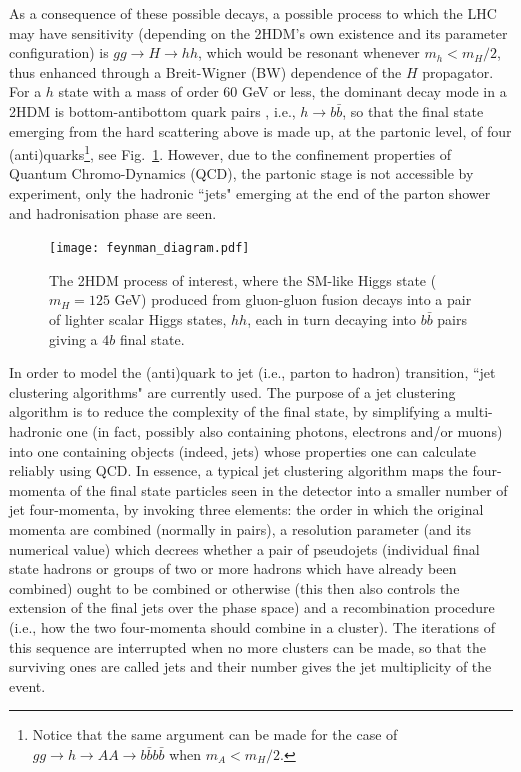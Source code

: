 \documentclass[12pt]{article}
\begin{document}
As a consequence of these possible decays, a possible process to which the LHC may have sensitivity (depending on the 2HDM's own existence and its parameter configuration) is $gg\to H\to hh$, which would be resonant whenever  $m_h<m_H/2$, thus enhanced through a Breit-Wigner (BW) dependence of the $H$ propagator. For a $h$ state with a mass of order 60 GeV or less, the dominant decay mode in a 2HDM is bottom-antibottom quark pairs \cite{Moretti:1994ds,Djouadi:1995gv}, i.e., $h\to b\bar b$, so that the final state emerging from the hard scattering above is made up, at the partonic level, of four (anti)quarks\footnote{Notice that the same argument can be made for the case of $gg\to h\to AA\to b\bar b b\bar b$ when $m_A<m_H/2$.}, see Fig.~\ref{fig:diagram}. However, due to the confinement properties of Quantum Chromo-Dynamics (QCD), the partonic stage is not accessible by experiment, only the hadronic ``jets" emerging at the end of the parton shower and hadronisation phase are seen.

\begin{figure}[ht!]
	\centering
	\texttt{[image: feynman\_diagram.pdf]}
	\caption{The 2HDM process of interest, where the SM-like Higgs state ($m_H=125$ GeV) produced from gluon-gluon fusion decays into a pair of lighter scalar Higgs states, $hh$, each in turn decaying into $b\bar{b}$ pairs giving a $4b$ final state.}
\label{fig:diagram}
\end{figure}

In order to model the (anti)quark to jet (i.e., parton to hadron) transition, ``jet clustering algorithms" are currently  used. The purpose of a jet clustering  algorithm is to
reduce the complexity of the final state, by simplifying a multi-hadronic one (in fact, possibly also containing photons, electrons and/or muons)  into one containing objects (indeed,  jets) whose properties one can calculate reliably using QCD. In essence, a typical jet clustering algorithm maps the four-momenta of the final state particles seen in the detector into a smaller number of jet four-momenta, by invoking three elements: the order in which the original momenta are combined (normally in pairs), a resolution parameter (and its numerical value) which decrees whether a pair of pseudojets (individual final state hadrons or groups of two or more hadrons which have already been combined) ought to be combined or otherwise (this then also controls the extension of the final jets over the phase space) and a recombination procedure (i.e.,
how the two four-momenta should combine in a cluster). The iterations of this sequence are interrupted when no more clusters can be made, so that the surviving ones are called jets and their number gives the jet multiplicity of the event.
\end{document}
